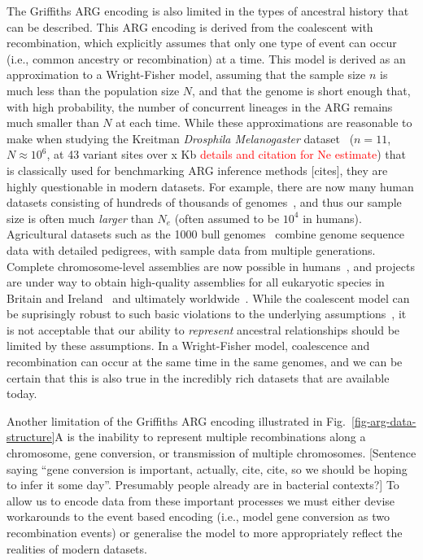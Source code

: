\documentclass{article}
\begin{document}
The Griffiths ARG encoding is also limited in the types of ancestral
history that can be described. This ARG encoding is derived from the coalescent
with recombination, which explicitly assumes that only one type
of event can occur (i.e., common ancestry or recombination) at a
time. This model is derived as an approximation to a Wright-Fisher
model, assuming that the sample size $n$ is much less than the
population size $N$, and that the genome is short enough that,
with high probability, the number of concurrent lineages in the ARG remains
much smaller than $N$ at each time. While these approximations are
reasonable
to make when studying the Kreitman \emph{Drosphila Melanogaster}
dataset~\citep{kreitman1983nucleotide} ($n=11$, $N\approx 10^6$,
at 43 variant sites over x Kb \textcolor{red}{details and citation
for Ne estimate}) that is classically used for benchmarking
ARG inference methods [cites],
they are highly questionable in modern datasets. %
For example, there are now many
human datasets consisting of hundreds of thousands of
genomes~\citep{bycroft2018genome,karczewski2020mutational,tanjo2021practical},
and thus our sample size is often much \emph{larger} than $N_e$
(often assumed to be $10^4$ in humans).
Agricultural datasets such as the 1000 bull genomes~\citep{hayes20191000}
combine genome sequence data with detailed pedigrees, with
sample data from multiple generations.
Complete chromosome-level assemblies are now possible
in humans~\citep{miga2020telomere},
and projects are under way to obtain high-quality assemblies
for all eukaryotic species in Britain and Ireland~\citep{darwin2022sequence}
and ultimately worldwide~\citep{lewin2022earth}.
While the coalescent model can be suprisingly robust to such
basic violations to the underlying assumptions~\citep{
wakeley2012gene,bhaskar2014distortion,nelson2020accounting},
it is not acceptable that our ability to \emph{represent}
ancestral relationships should be limited by these assumptions.
In a Wright-Fisher model, coalescence and recombination can
occur at the same time in the same genomes, and we can be
certain that this is also true in the incredibly rich
datasets that are available today.

Another limitation of the Griffiths ARG encoding illustrated in
Fig.~\ref{fig-arg-data-structure}A is the inability to represent
multiple recombinations along a chromosome, gene conversion,
or transmission of multiple chromosomes.
[Sentence saying ``gene conversion is important, actually, cite, cite,
so we should be hoping to infer it some day''. Presumably people
already are in bacterial contexts?]
To allow us to encode data from these important processes we
must either devise workarounds to the event based encoding
(i.e., model gene conversion as two recombination events) or
generalise the model to more appropriately reflect the realities
of modern datasets.
\end{document}

